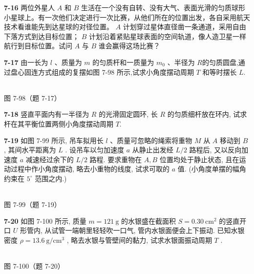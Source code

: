 \newpage

\textbf{7-16} 两位外星人 $A$ 和 $B$ 生活在一个没有自转、没有大气、表面光滑的匀质球形小星球上。有一次他们决定进行一次比赛，从他们所在的位置出发，各自采用航天技术看谁能先到达星球的对径位置。 $A$ 计划穿过星体直径凿一条通道，采用自由下落方式到达目标位置； $B$ 计划沿着紧贴星球表面的空间轨道，像人造卫星一样航行到目标位置。试问 $A$ 与 $B$ 谁会赢得这场比赛？

\newpage

\textbf{7-17} 由一长为 $l$ 、质量为 $m$ 的匀质杆和一质量为 $m_0$ 、半径为 $R$的匀质圆盘,通过盘心固连方式组成的复摆如图 7-98 所示,试求小角度摆动周期 $T$ 和等时摆长 $L$.

\begin{center}
\resizebox{0.22\textwidth}{!}{}\\[4pt]
{\small 图 7-98（题 7-17）}
\end{center}

\newpage

\textbf{7-18} 竖直平面内有一半径为 $R$ 的光滑固定圆环, 长 $R$ 的匀质细杆放在环内, 试求杆在其平衡位置两侧小角度摆动周期 $T$.

\newpage

\textbf{7-19} 如图 7-99 所示, 吊车拟用长 $l$ 、质量可忽略的绳索将重物 $M$ 从 $A$ 移动到 $B$ , 其间水平距离为 $L$ . 设吊车以匀加速度 $a$ 从静止出发经 $L/2$ 路程后, 又以反向加速度 $a$ 减速经过余下的 $L/2$ 路程. 要求重物在 $A, B$ 位置均处于静止状态, 且在运动过程中作小角度摆动, 略去小重物的线度, 试求可取的 $a$ 值. (小角度单摆的幅角约束在 $5^\circ$ 范围之内.)

\begin{center}
\resizebox{0.50\textwidth}{!}{}\\[4pt]
{\small 图 7-99（题 7-19）}
\end{center}

\newpage

\textbf{7-20} 如图 7-100 所示, 质量 $m = 121 \mathrm{~g}$ 的水银盛在截面积 $S = 0.30 \mathrm{~cm}^{2}$ 的竖直开口 $U$ 形管内, 从试管一端朝里轻轻吹一口气, 管内水银面便会上下振动. 已知水银密度 $\rho = 13.6 \mathrm{~g} / \mathrm{cm}^{3}$ , 略去水银与管壁间的黏力, 试求水银面振动周期 $T$ .

\begin{center}
\resizebox{0.31\textwidth}{!}{}\\[4pt]
{\small 图 7-100（题 7-20）}
\end{center}

